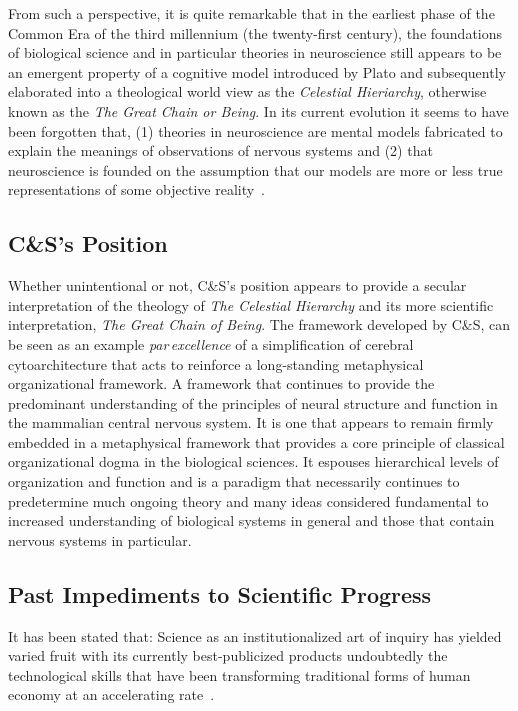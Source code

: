 \documentclass[10pt,letterpaper]{article}
\begin{document}
From such a perspective, it is quite remarkable that in the earliest phase of the Common Era of the third millennium (the twenty-first century), the foundations of biological science and in particular theories in neuroscience still appears to be an emergent property of a cognitive model introduced by Plato and subsequently elaborated into a theological world view as the {\it{Celestial Hieriarchy}}, otherwise known as the {\it{The Great Chain or Being}}. In its current evolution it seems to have been forgotten that, (1) theories in neuroscience are mental models fabricated to explain the meanings of observations of nervous systems and (2) that neuroscience is founded on the assumption that our models are more or less true representations of some objective reality~\cite{jacobson93}.

\subsection*{C\&S's Position}

Whether unintentional or not, C\&S's position appears to provide a secular interpretation of the theology of {\it{The Celestial Hierarchy}} and its more scientific interpretation, {\it{The Great Chain of Being}}. The framework developed by C\&S, can be seen as an example {\it{par\,excellence}} of a simplification of cerebral cytoarchitecture that acts to reinforce a long-standing metaphysical organizational framework. A framework that continues to provide the predominant understanding of the principles of neural structure and function in the mammalian central nervous system. It is one that appears to remain firmly embedded in a metaphysical framework that provides a core principle of classical organizational dogma in the biological sciences. It espouses hierarchical levels of organization and function and is a paradigm that necessarily continues to predetermine much ongoing theory and many ideas considered fundamental to increased understanding of biological systems in general and those that contain nervous systems in particular.


\subsection*{Past Impediments to Scientific Progress}

It has been stated that: Science as an institutionalized art of inquiry has yielded varied fruit with its currently best-publicized products undoubtedly the technological skills that have been transforming traditional forms of human economy at an accelerating rate~\cite{nagel61}.
\end{document}
